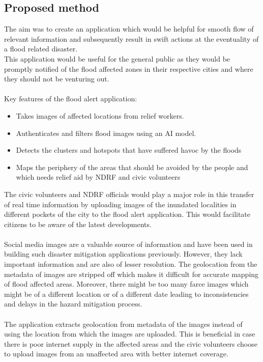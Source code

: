 \documentclass[12pt]{article}
\begin{document}
\subsection{Proposed method}
The aim was to create an application which would be helpful for smooth flow of relevant information and subsequently result in swift actions at the eventuality of a flood related disaster.\\
This application would be useful for the general public as they would be promptly notified of the flood affected zones in their respective cities and where they should not be venturing out. \\\\
Key features of the flood alert application:
\begin{itemize}
	\item Takes images of affected locations from relief workers.
	\item Authenticates and filters flood images using an AI model.	
	\item Detects the clusters and hotspots that have suffered havoc by the floods
	\item Maps the periphery of the areas that should be avoided by the people and which needs relief aid by NDRF and civic volunteers
\end{itemize}
The civic volunteers and NDRF officials would play a major role in this transfer of real time information by uploading images of the inundated localities in different pockets of the city to the flood alert application. This would facilitate citizens to be aware of the latest developments.\\\\
Social media images are a valuable source of information and have been used in building such disaster mitigation applications previously. However, they lack important information and are also of lesser resolution. The geolocation from the metadata of images are stripped off which makes it difficult for accurate mapping of flood affected areas. Moreover, there might be too many farce images which might be of a different location or of a different date leading to inconsistencies and  delays in the hazard mitigation process.\\\\
The application extracts geolocation from metadata of the images instead of using the location from which the images are uploaded. This is beneficial in case there is poor internet supply in the affected areas and the civic volunteers choose to upload images from an unaffected area with better internet coverage.
\end{document}
